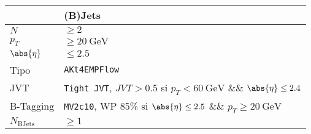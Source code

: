 \begin{tabular}{L{15mm} C{90mm}}
\toprule
                    & (B)Jets                                                                              \\
\midrule
$N$                 & $\geq 2$                                                                             \\
$p_T$               & $\geq \SI{20}{\GeV}$                                                                 \\
$\abs{\eta}$        & $\leq 2.5$                                                                           \\
Tipo                & \texttt{AKt4EMPFlow}                                                                 \\
JVT                 & \texttt{Tight JVT}, $JVT > 0.5$ si $p_T < \SI{60}{\GeV}$ \&\& $\abs{\eta} \leq 2.4$  \\
B-Tagging           & \texttt{MV2c10}, WP 85\% si $\abs{\eta} \leq 2.5$ \&\& $p_T \geq \SI{20}{\GeV}$      \\
$N_{\text{BJets}}$  & $\geq 1$                                                                             \\
\bottomrule
\end{tabular}
